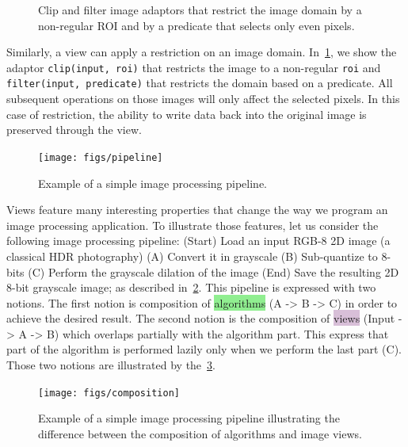 \begin{figure}[htbp]
  \centering
  \hfil

  \caption{Clip and filter image adaptors that restrict the image domain by a non-regular ROI and by a predicate that
    selects only even pixels.}
  \label{fig.view.clip}
\end{figure}

Similarly, a view can apply a restriction on an image domain. In~\cref{fig.view.clip}, we show the adaptor
\texttt{clip(input, roi)} that restricts the image to a non-regular \texttt{roi} and \texttt{filter(input, predicate)}
that restricts the domain based on a predicate. All subsequent operations on those images will only affect the selected
pixels. In this case of restriction, the ability to write data back into the original image is preserved through the
view.

\begin{figure}[htbp]
  \centering
  \texttt{[image: figs/pipeline]}
  \caption{Example of a simple image processing pipeline.}
  \label{fig.view.pipeline}
\end{figure}

Views feature many interesting properties that change the way we program an image processing application. To illustrate
those features, let us consider the following image processing pipeline: (Start) Load an input RGB-8 2D image (a
classical HDR photography) (A) Convert it in grayscale (B) Sub-quantize to 8-bits (C) Perform the grayscale dilation of
the image (End) Save the resulting 2D 8-bit grayscale image; as described in~\cref{fig.view.pipeline}. This pipeline is
expressed with two notions. The first notion is composition of \colorbox{lightgreen}{algorithms} (A -> B -> C) in order
to achieve the desired result. The second notion is the composition of \colorbox{thistle}{views} (Input -> A -> B) which
overlaps partially with the algorithm part. This express that part of the algorithm is performed lazily only when we
perform the last part (C). Those two notions are illustrated by the~\cref{fig.view.comp}.

\begin{figure}[htbp]
  \centering
  \texttt{[image: figs/composition]}
  \caption{Example of a simple image processing pipeline illustrating the difference between the composition of
    algorithms and image views.}
  \label{fig.view.comp}
\end{figure}

